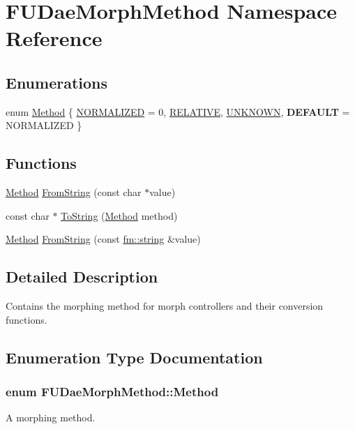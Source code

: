 \hypertarget{namespaceFUDaeMorphMethod}{
\section{FUDaeMorphMethod Namespace Reference}
\label{namespaceFUDaeMorphMethod}
}
\subsection*{Enumerations}
\begin{DoxyCompactItemize}
\item 
enum \hyperlink{namespaceFUDaeMorphMethod_a097fa073638c4df9edf9479f8561329e}{Method} \{ \hyperlink{namespaceFUDaeMorphMethod_a097fa073638c4df9edf9479f8561329ea7f8d1d485cf8763e1296f6b33ef7a052}{NORMALIZED} =  0, 
\hyperlink{namespaceFUDaeMorphMethod_a097fa073638c4df9edf9479f8561329ea8fa8a945887cc2b426e5835fc5985862}{RELATIVE}, 
\hyperlink{namespaceFUDaeMorphMethod_a097fa073638c4df9edf9479f8561329eae8b1c9c9348ab231bb1220fe64eab392}{UNKNOWN}, 
{\bfseries DEFAULT} =  NORMALIZED
 \}
\end{DoxyCompactItemize}
\subsection*{Functions}
\begin{DoxyCompactItemize}
\item 
\hyperlink{namespaceFUDaeMorphMethod_a097fa073638c4df9edf9479f8561329e}{Method} \hyperlink{namespaceFUDaeMorphMethod_a89b93fd31d893e69c5c0c9d8c87f63d0}{FromString} (const char $\ast$value)
\item 
const char $\ast$ \hyperlink{namespaceFUDaeMorphMethod_abe696cb0c4699279b68f2a24761882c9}{ToString} (\hyperlink{namespaceFUDaeMorphMethod_a097fa073638c4df9edf9479f8561329e}{Method} method)
\item 
\hyperlink{namespaceFUDaeMorphMethod_a097fa073638c4df9edf9479f8561329e}{Method} \hyperlink{namespaceFUDaeMorphMethod_a86f00af2a51ced8fae493879e325fbf7}{FromString} (const \hyperlink{classfm_1_1stringT}{fm::string} \&value)
\end{DoxyCompactItemize}


\subsection{Detailed Description}
Contains the morphing method for morph controllers and their conversion functions. 

\subsection{Enumeration Type Documentation}
\hypertarget{namespaceFUDaeMorphMethod_a097fa073638c4df9edf9479f8561329e}{
\subsubsection[{Method}]{\setlength{\rightskip}{0pt plus 5cm}enum {\bf FUDaeMorphMethod::Method}}}
\label{namespaceFUDaeMorphMethod_a097fa073638c4df9edf9479f8561329e}
A morphing method.

